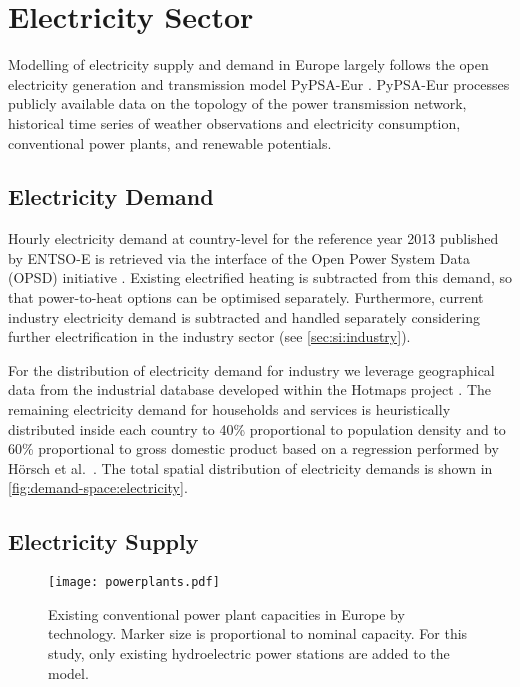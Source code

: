 \section{Electricity Sector}
\label{sec:si:electricity}

Modelling of electricity supply and demand in Europe largely follows the open
electricity generation and transmission model PyPSA-Eur . PyPSA-Eur processes publicly available data on
the topology of the power transmission network, historical time series of
weather observations and electricity consumption, conventional power plants, and
renewable potentials.

\subsection{Electricity Demand}
\label{sec:si:electricity:demand}

Hourly electricity demand at country-level for the reference year 2013 published
by ENTSO-E is retrieved via the interface of the Open Power System Data (OPSD)
initiative . Existing electrified heating is subtracted from this
demand, so that power-to-heat options can be optimised separately. Furthermore,
current industry electricity demand is subtracted and handled separately
considering further electrification in the industry sector (see \cref{sec:si:industry}).

For the distribution of electricity demand for industry we leverage geographical
data from the industrial database developed within the Hotmaps project
. The remaining
electricity demand for households and services is heuristically distributed
inside each country to 40\% proportional to population density and to 60\%
proportional to gross domestic product based on a regression performed by Hörsch
et al.~. The total spatial distribution of
electricity demands is shown in \cref{fig:demand-space:electricity}.

\subsection{Electricity Supply}

\begin{SCfigure}
    \caption{ Existing conventional power plant capacities in Europe by
        technology. Marker size is proportional to nominal capacity. For this
        study, only existing hydroelectric power stations are added to the
        model.}
    \label{fig:powerplants}
    \texttt{[image: powerplants.pdf]}
\end{SCfigure}

